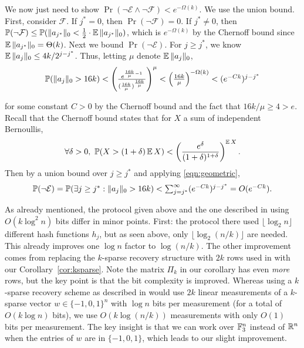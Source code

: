 We now just need to show $\Pr(\neg\mathcal{E} \wedge \neg\mathcal{F}) < e^{-\Omega(k)}$. We use the union bound. First, consider $\mathcal{F}$. If $j^* = 0$, then $\Pr(\neg\mathcal{F}) = 0$. If $j^*\neq 0$, then $\operatorname*{\mathbb{P}}(\neg\mathcal{F}) \le \operatorname*{\mathbb{P}}(\|a_{j^*}\|_0 < \frac 12 \cdot\operatorname*{\mathbb{E}}\|a_{j^*}\|_0)$, which is $e^{-\Omega(k)}$ by the Chernoff bound since $\operatorname*{\mathbb{E}}\|a_{j^*}\|_0 = \Theta(k)$. Next we bound $\Pr(\neg \mathcal{E})$. For $j\ge j^*$, we know $\operatorname*{\mathbb{E}}\|a_j\|_0 \le 4k/2^{j-j^*}$. Thus, letting $\mu$ denote $\operatorname*{\mathbb{E}}\|a_j\|_0$, 
\begin{equation}
$$\Pr(\|a_j\|_0 > 16k) < \left(\frac{e^{\frac{16k}{\mu} - 1}}{(\frac{16k}{\mu})^{\frac{16k}{\mu}}}\right)^\mu < \left(\frac{16k}{\mu}\right)^{-\Omega(k)} < (e^{-Ck})^{j-j^*}$$\label{eqn:geometric}
\end{equation}

for some constant $C>0$ by the Chernoff bound and the fact that $16k/\mu \ge 4 > e$. Recall that the Chernoff bound states that for $X$ a sum of independent Bernoullis,
$$
\forall \delta > 0,\ \operatorname*{\mathbb{P}}(X > (1+\delta) \operatorname*{\mathbb{E}} X) < \left(\frac{e^\delta}{(1+\delta)^{1+\delta}}\right)^{\operatorname*{\mathbb{E}} X} .
$$
Then by a union bound over $j\ge j^*$ and applying \eqref{eqn:geometric},
\begin{equation}
$$
\Pr(\neg \mathcal{E}) = \Pr(\exists j\ge j^*: \|a_j\|_0 > 16k) < \sum_{j=j^*}^\infty (e^{-Ck})^{j-j^*} = O(e^{-Ck}) .
$$
\end{equation}

\begin{remark}\label{rem:recov}
\textup{
As already mentioned, the protocol given above and the one described in \cite{JowhariST11} using $O(k\log^2 n)$ bits differ in minor points. First: the protocol there used $\lfloor\log_2 n\rfloor$ different hash functions $h_j$, but as seen above, only $\lfloor \log_2(n/k)\rfloor$ are needed. This already improves one $\log n$ factor to $\log(n/k)$. The other improvement comes from replacing the $k$-sparse recovery structure with $2k$ rows used in \cite{JowhariST11} with our Corollary~\ref{cor:ksparse}. Note the matrix $\Pi_k$ in our corollary has even {\it more} rows, but the key point is that the bit complexity is improved. Whereas using a $k$-sparse recovery scheme as described in \cite{JowhariST11} would use $2k$ linear measurements of a $k$-sparse vector $w\in\{-1,0,1\}^n$ with $\log n$ bits per measurement (for a total of $O(k\log n)$ bits), we use $O(k\log(n/k))$ measurements with only $O(1)$ bits per measurement. The key insight is that we can work over $\mathbb{F}_3^n$ instead of $\mathbb{R}^n$ when the entries of $w$ are in $\{-1,0,1\}$, which leads to our slight improvement.
}
\end{remark}

